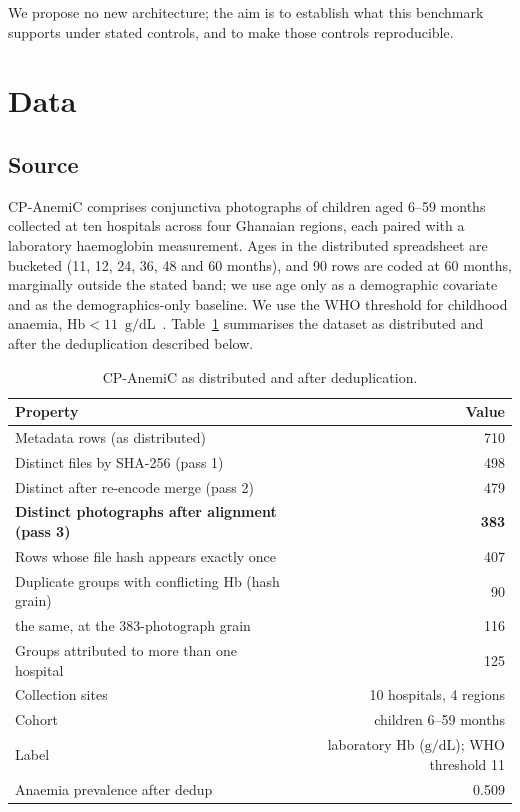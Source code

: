 \documentclass[11pt,a4paper]{article}
\newcommand{\gdl}{\ensuremath{\mathrm{g/dL}}}
\begin{document}
We propose no new architecture; the aim is to establish what this benchmark supports under
stated controls, and to make those controls reproducible.

\section{Data}

\subsection{Source}

CP-AnemiC \cite{asare2023cpanemic} comprises conjunctiva photographs of children aged
6--59 months collected at ten hospitals across four Ghanaian regions, each paired with a
laboratory haemoglobin measurement. Ages in the distributed spreadsheet are bucketed (11, 12, 24,
36, 48 and 60 months), and 90 rows are coded at 60 months, marginally outside the stated band; we
use age only as a demographic covariate and as the demographics-only baseline. We use the WHO threshold for childhood anaemia,
$\mathrm{Hb}<11$~\gdl~\cite{who2011}. Table~\ref{tab:data} summarises the dataset as distributed and after
the deduplication described below.

\begin{table}[htbp]
\centering
\caption{CP-AnemiC as distributed and after deduplication.}
\label{tab:data}
\small
\begin{tabular}{lr}
\toprule
Property & Value \\
\midrule
Metadata rows (as distributed)          & 710 \\
Distinct files by SHA-256 (pass 1)      & 498 \\
Distinct after re-encode merge (pass 2) & 479 \\
\textbf{Distinct photographs after alignment (pass 3)} & \textbf{383} \\
Rows whose file hash appears exactly once & 407 \\
Duplicate groups with conflicting Hb (hash grain) & 90 \\
\quad the same, at the 383-photograph grain & 116 \\
Groups attributed to more than one hospital & 125 \\
Collection sites                    & 10 hospitals, 4 regions \\
Cohort                              & children 6--59 months \\
Label                               & laboratory Hb (\gdl); WHO threshold 11 \\
Anaemia prevalence after dedup      & 0.509 \\
\bottomrule
\end{tabular}
\end{table}
\end{document}
